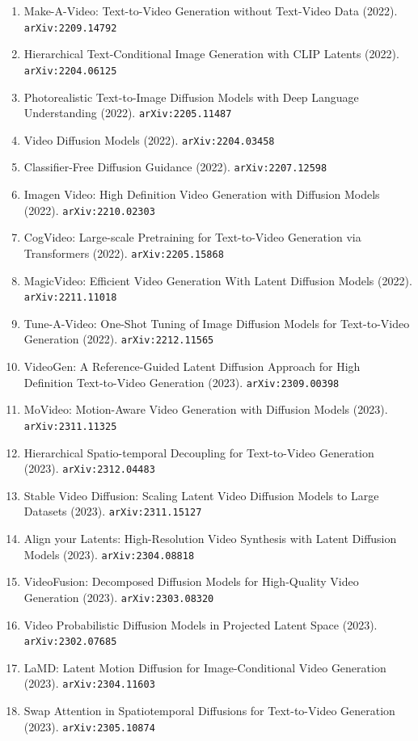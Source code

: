 \documentclass[11pt]{article}
\begin{document}
\begin{enumerate}
  \item Make-A-Video: Text-to-Video Generation without Text-Video Data (2022). \texttt{arXiv:2209.14792}
  \item Hierarchical Text-Conditional Image Generation with CLIP Latents (2022). \texttt{arXiv:2204.06125}
  \item Photorealistic Text-to-Image Diffusion Models with Deep Language
  Understanding (2022). \texttt{arXiv:2205.11487}
  \item Video Diffusion Models (2022). \texttt{arXiv:2204.03458}
  \item Classifier-Free Diffusion Guidance (2022). \texttt{arXiv:2207.12598}
  \item Imagen Video: High Definition Video Generation with Diffusion Models (2022). \texttt{arXiv:2210.02303}
  \item CogVideo: Large-scale Pretraining for Text-to-Video Generation via
  Transformers (2022). \texttt{arXiv:2205.15868}
  \item MagicVideo: Efficient Video Generation With Latent Diffusion Models (2022). \texttt{arXiv:2211.11018}
  \item Tune-A-Video: One-Shot Tuning of Image Diffusion Models for
  Text-to-Video Generation (2022). \texttt{arXiv:2212.11565}
  \item VideoGen: A Reference-Guided Latent Diffusion Approach for High
  Definition Text-to-Video Generation (2023). \texttt{arXiv:2309.00398}
  \item MoVideo: Motion-Aware Video Generation with Diffusion Models (2023). \texttt{arXiv:2311.11325}
  \item Hierarchical Spatio-temporal Decoupling for Text-to-Video Generation (2023). \texttt{arXiv:2312.04483}
  \item Stable Video Diffusion: Scaling Latent Video Diffusion Models to Large
  Datasets (2023). \texttt{arXiv:2311.15127}
  \item Align your Latents: High-Resolution Video Synthesis with Latent
  Diffusion Models (2023). \texttt{arXiv:2304.08818}
  \item VideoFusion: Decomposed Diffusion Models for High-Quality Video
  Generation (2023). \texttt{arXiv:2303.08320}
  \item Video Probabilistic Diffusion Models in Projected Latent Space (2023). \texttt{arXiv:2302.07685}
  \item LaMD: Latent Motion Diffusion for Image-Conditional Video Generation (2023). \texttt{arXiv:2304.11603}
  \item Swap Attention in Spatiotemporal Diffusions for Text-to-Video Generation (2023). \texttt{arXiv:2305.10874}

\end{enumerate}
\end{document}
